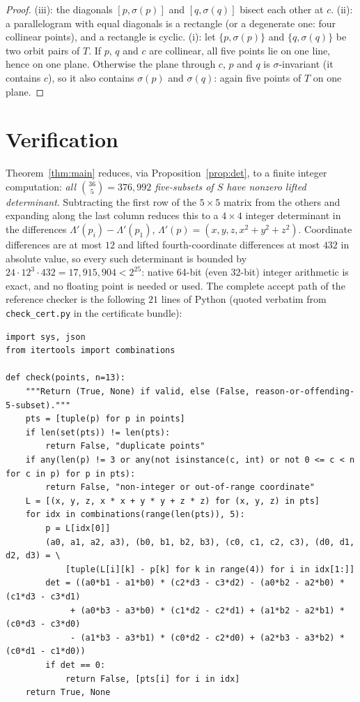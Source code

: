\documentclass[10pt]{article}
\theoremstyle{remark}
\begin{document}
\begin{proof}
(iii): the diagonals $[p, \sigma(p)]$ and $[q, \sigma(q)]$ bisect each other
at $c$. (ii): a parallelogram with equal diagonals is a rectangle (or a
degenerate one: four collinear points), and a rectangle is cyclic. (i): let
$\{p,\sigma(p)\}$ and $\{q,\sigma(q)\}$ be two orbit pairs of $T$. If $p$,
$q$ and $c$ are collinear, all five points lie on one line, hence on one
plane. Otherwise the plane through $c$, $p$ and $q$ is $\sigma$-invariant
(it contains $c$), so it also contains $\sigma(p)$ and $\sigma(q)$: again
five points of $T$ on one plane.
\end{proof}

\section{Verification}\label{sec:verification}

Theorem~\ref{thm:main} reduces, via Proposition~\ref{prop:det}, to a finite
integer computation: \emph{all $\binom{36}{5} = 376{,}992$ five-subsets of
$S$ have nonzero lifted determinant}. Subtracting the first row of the
$5\times 5$ matrix from the others and expanding along the last column
reduces this to a $4\times 4$ integer determinant in the differences
$\Lambda'(p_i) - \Lambda'(p_1)$, $\Lambda'(p) =
(x,y,z,x^2{+}y^2{+}z^2)$. Coordinate differences are at most $12$ and lifted
fourth-coordinate differences at most $432$ in absolute value, so every such
determinant is bounded by $24 \cdot 12^3 \cdot 432 = 17{,}915{,}904 <
2^{25}$: native 64-bit (even 32-bit) integer arithmetic is exact, and no
floating point is needed or used. The complete accept path of the reference
checker is the following $21$ lines of Python (quoted verbatim from
\texttt{check\_cert.py} in the certificate bundle):

{\footnotesize
\begin{verbatim}
import sys, json
from itertools import combinations

def check(points, n=13):
    """Return (True, None) if valid, else (False, reason-or-offending-5-subset)."""
    pts = [tuple(p) for p in points]
    if len(set(pts)) != len(pts):
        return False, "duplicate points"
    if any(len(p) != 3 or any(not isinstance(c, int) or not 0 <= c < n for c in p) for p in pts):
        return False, "non-integer or out-of-range coordinate"
    L = [(x, y, z, x * x + y * y + z * z) for (x, y, z) in pts]
    for idx in combinations(range(len(pts)), 5):
        p = L[idx[0]]
        (a0, a1, a2, a3), (b0, b1, b2, b3), (c0, c1, c2, c3), (d0, d1, d2, d3) = \
            [tuple(L[i][k] - p[k] for k in range(4)) for i in idx[1:]]
        det = ((a0*b1 - a1*b0) * (c2*d3 - c3*d2) - (a0*b2 - a2*b0) * (c1*d3 - c3*d1)
             + (a0*b3 - a3*b0) * (c1*d2 - c2*d1) + (a1*b2 - a2*b1) * (c0*d3 - c3*d0)
             - (a1*b3 - a3*b1) * (c0*d2 - c2*d0) + (a2*b3 - a3*b2) * (c0*d1 - c1*d0))
        if det == 0:
            return False, [pts[i] for i in idx]
    return True, None
\end{verbatim}
}
\end{document}
